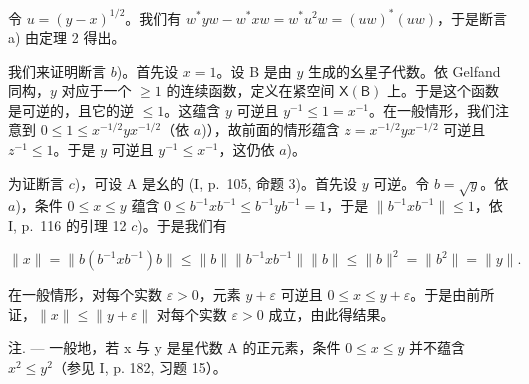 令 \(u = (y - x)^{1/2}\)。我们有 \(w^{*}yw - w^{*}xw = w^{*}u^{2}w = (uw)^{*}(uw)\)，于是断言 a) 由定理 2 得出。

我们来证明断言 \(b\))。首先设 \(x = 1\)。设 B 是由 \(y\) 生成的幺星子代数。依 Gelfand 同构，\(y\) 对应于一个 \(\geqslant 1\) 的连续函数，定义在紧空间 \(\mathsf{X}(\mathsf{B})\) 上。于是这个函数是可逆的，且它的逆 \(\leqslant 1\)。这蕴含 \(y\) 可逆且 \(y^{-1} \leqslant 1 = x^{-1}\)。在一般情形，我们注意到 \(0 \leqslant 1 \leqslant x^{-1/2}yx^{-1/2}\)（依 \(a\))），故前面的情形蕴含 \(z = x^{-1/2}yx^{-1/2}\) 可逆且 \(z^{-1} \leqslant 1\)。于是 \(y\) 可逆且 \(y^{-1} \leqslant x^{-1}\)，这仍依 \(a\))。

为证断言 \(c\))，可设 A 是幺的 (I, p.~105, 命题 3)。首先设 \(y\) 可逆。令 \(b = \sqrt{y}\)。依 \(a\))，条件 \(0 \leqslant x \leqslant y\) 蕴含 \(0 \leqslant b^{-1}xb^{-1} \leqslant b^{-1}yb^{-1} = 1\)，于是 \(\|b^{-1}xb^{-1}\| \leqslant 1\)，依 I, p.~116 的引理 12 \(c\))。于是我们有

\[
\| x \| = \| b (b ^ {- 1} x b ^ {- 1}) b \| \leqslant \| b \| \| b ^ {- 1} x b ^ {- 1} \| \| b \| \leqslant \| b \| ^ {2} = \| b ^ {2} \| = \| y \|.
\]

在一般情形，对每个实数 \(\varepsilon > 0\)，元素 \(y + \varepsilon\) 可逆且 \(0 \leqslant x \leqslant y + \varepsilon\)。于是由前所证，\(\|x\| \leqslant \|y + \varepsilon\|\) 对每个实数 \(\varepsilon > 0\) 成立，由此得结果。

注. — 一般地，若 x 与 y 是星代数 A 的正元素，条件 \(0 \leqslant x \leqslant y\) 并不蕴含 \(x^{2} \leqslant y^{2}\)（参见 I, p. 182, 习题 15）。

